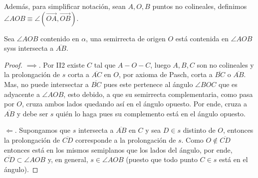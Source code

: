 \documentclass[11pt,a4paper]{book}
\begin{document}
Además, para simplificar notación, sean $A,O,B$ puntos no colineales, definimos $\angle AOB\equiv\angle(\overrightarrow{OA},\overrightarrow{OB})$.
\begin{thm}
Sea $\angle AOB$ contenido en $\alpha$, una semirrecta de origen $O$ está contenida en $\angle AOB$ syss intersecta a $\overline{AB}$.
\end{thm}
\begin{proof}
$\implies$. Por II2 existe $C$ tal que $A-O-C$, luego $A,B,C$ son no colineales y la prolongación de $s$ corta a $\overline{AC}$ en $O$, por axioma de Pasch, corta a $\overline{BC}$ o $\overline{AB}$. Mas, no puede intersectar a $\overline{BC}$ pues este pertenece al ángulo $\angle BOC$ que es adyacente a $\angle AOB$, esto debido, a que su semirrecta complementaria, como pasa por $O$, cruza ambos lados quedando así en el ángulo opuesto. Por ende, cruza a $\overline{AB}$ y debe ser $s$ quién lo haga pues su complemento está en el ángulo opuesto.
\begin{figure}
\centering
{}
\end{figure}

$\Longleftarrow$. Supongamos que $s$ intersecta a $\overline{AB}$ en $C$ y sea $D\in s$ distinto de $O$, entonces la prolongación de $\overline{CD}$ corresponde a la prolongación de $s$. Como $O\notin\overline{CD}$ entonces está en los mismos semiplanos que los lados del ángulo, por ende, $\overline{CD}\subset\angle AOB$ y, en general, $s\in\angle AOB$ (puesto que todo punto $C\in s$ está en el ángulo).
\end{proof}
\end{document}
